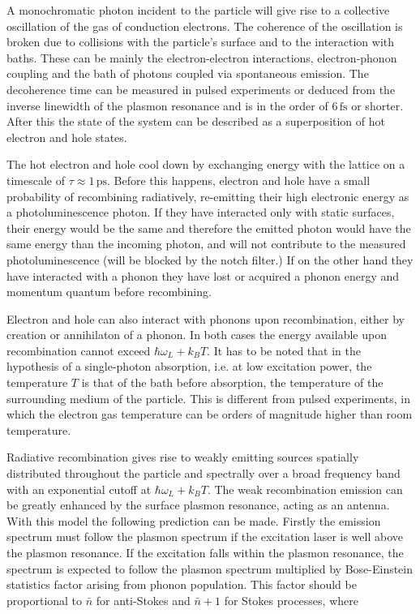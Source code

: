 \documentclass[journal=nalefd,manuscript=letter]{achemso}
\newcommand{\fs}{\ensuremath{\,\textrm{fs}}}
\newcommand{\ps}{\ensuremath{\,\textrm{ps}}}
\begin{document}
A monochromatic photon incident to the particle will give rise to a collective
oscillation of the gas of conduction electrons. The coherence of the oscillation
is broken due to collisions with the particle's surface and to the interaction
with baths. These can be mainly the electron-electron interactions,
electron-phonon coupling and the bath of photons coupled via spontaneous
emission. The decoherence time can be measured in pulsed experiments or
deduced from the inverse linewidth of the plasmon resonance and is in the order
of $6\fs$ or shorter. After this the state of the system can be described as a
superposition of hot electron and hole states. 

The hot electron and hole cool down by exchanging energy with the lattice on a
timescale of $\tau\approx1\ps$. Before this happens, electron and hole have a
small probability of recombining radiatively, re-emitting their high electronic
energy as a photoluminescence photon. If they have interacted only with static
surfaces, their energy would be the same and therefore the emitted photon would
have the same energy than the incoming photon, and will not contribute to the
measured photoluminescence (will be blocked by the notch filter.) If on the
other hand they have interacted with a phonon they have lost or acquired a
phonon energy and momentum quantum before recombining. 

Electron and hole can also interact with phonons upon recombination, either by
creation or annihilaton of a phonon. In both cases the energy available upon
recombination cannot exceed $\hbar\omega_L+k_BT$. It has to be noted that in the
hypothesis of a single-photon absorption, i.e. at low excitation power, the
temperature $T$ is that of the bath before absorption, the temperature of the
surrounding medium of the particle. This is different from pulsed experiments,
in which the electron gas temperature can be orders of magnitude higher than
room temperature. 

Radiative recombination gives rise to weakly emitting sources
spatially distributed throughout the particle and spectrally over a broad
frequency band with an exponential cutoff at $\hbar\omega_L+k_BT$. The
weak recombination emission can be greatly enhanced by the surface plasmon
resonance, acting as an antenna. With this model the following prediction can be
made. Firstly the emission spectrum must follow the plasmon spectrum if the
excitation laser is well above the plasmon resonance. If the excitation falls
within the plasmon resonance, the spectrum is expected to follow the plasmon
spectrum multiplied by Bose-Einstein statistics factor arising from phonon
population. This factor should be proportional to $\bar{n}$ for
anti-Stokes and $\bar{n}+1$ for Stokes processes, where
\end{document}
